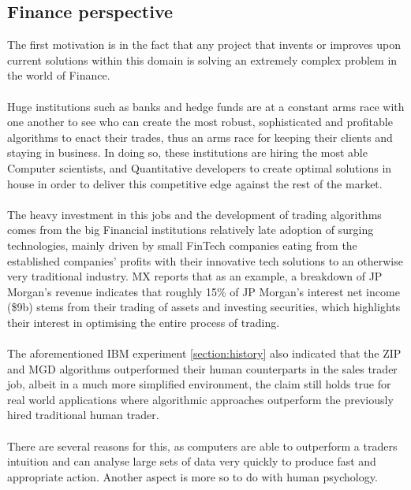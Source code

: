 \documentclass[ %
                    author={Ashwinder Khurana},
                supervisor={Prof Dave Cliff},
                    degree={MEng},
                     title={The Deeply Reinforced Trader},
                  subtitle={},
                      type={enterprise},
                      year={2020} ]{dissertation}
\begin{document}
\subsection{Finance perspective}
\vspace{0.5cm} 
The first motivation is in the fact that any project that invents or improves upon current solutions within this domain is solving an extremely complex problem in the world of Finance. 
\\
\\
Huge institutions such as banks and hedge funds are at a constant arms race with one another to see who can create the most robust, sophisticated and profitable algorithms to enact their trades, thus an arms race for keeping their clients and staying in business. In doing so, these institutions are hiring the most able Computer scientists, and Quantitative developers to create optimal solutions in house in order to deliver this competitive edge against the rest of the market. 
\\
\\
The heavy investment in this jobs and the development of trading algorithms comes from the big Financial institutions relatively late adoption of surging technologies, mainly driven by small FinTech companies eating from the established companies' profits with their innovative tech solutions to an otherwise very traditional industry.  MX reports \cite{mx banks profit breakdown https://www.mx.com/moneysummit/top-us-retail-banks-income-revenue} that as an example, a breakdown of JP Morgan's revenue indicates that roughly 15\% of JP Morgan's interest net income (\$9b) stems from their trading of assets and investing securities, which highlights their interest in optimising the entire process of trading. 
\\
\\
\noindent The aforementioned IBM experiment \ref{section:history} also indicated that the ZIP and MGD algorithms outperformed their human counterparts in the sales trader job, albeit in a much more simplified environment, the claim still holds true for real world applications where algorithmic approaches outperform the previously hired traditional human trader. 
\\
\\
There are several reasons for this, as computers are able to outperform a traders intuition and can analyse large sets of data very quickly to produce fast and appropriate action. Another aspect is more so to do with human psychology. 
\end{document}
